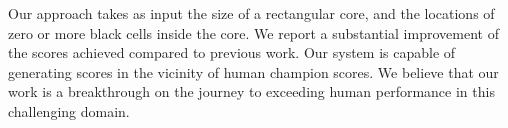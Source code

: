 
Our approach takes as input the size of a rectangular core,
and the locations of zero or more black cells inside the core.
We report a substantial improvement of the scores achieved compared
to previous work.
Our system is capable of generating scores in the vicinity of human champion scores.
We believe that our work is a breakthrough on the journey to exceeding
human performance in this challenging domain.


